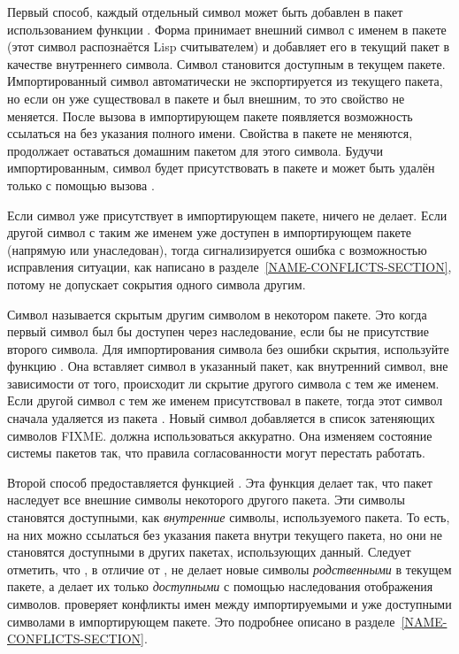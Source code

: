 Первый способ, каждый отдельный символ может быть добавлен в пакет использованием
функции . Форма  принимает внешний
символ с именем  в пакете  (этот символ распознаётся Lisp
считывателем) и добавляет его в текущий пакет в качестве внутреннего
символа. Символ становится доступным в текущем пакете. Импортированный символ
автоматически не экспортируется из текущего пакета, но если он уже существовал в
пакете и был внешним, то это свойство не меняется. После вызова 
в импортирующем пакете появляется возможность ссылаться на  без
указания полного имени. Свойства  в пакете  не меняются,
 продолжает оставаться домашним пакетом для этого символа. Будучи
импортированным, символ будет присутствовать в пакете и может быть удалён только
с помощью вызова .

Если символ уже присутствует в импортирующем пакете,  ничего не
делает. Если другой символ с таким же именем  уже доступен в
импортирующем пакете (напрямую или унаследован), тогда сигнализируется ошибка с
возможностью исправления ситуации, как написано в
разделе~\ref{NAME-CONFLICTS-SECTION}, потому  не допускает сокрытия
одного символа другим.

Символ называется скрытым другим символом в некотором пакете. Это когда первый
символ был бы доступен через наследование, если бы не присутствие второго
символа.
Для импортирования символа без ошибки скрытия, используйте функцию
. Она вставляет символ в указанный пакет, как внутренний
символ, вне зависимости от того, происходит ли скрытие другого символа с тем же
именем.
Если другой символ с тем же именем присутствовал в пакете, тогда этот символ
сначала удаляется из пакета . Новый символ добавляется в список
затеняющих символов FIXME.  должна использоваться
аккуратно. Она изменяем состояние системы пакетов так, что правила согласованности
могут перестать работать.

Второй способ предоставляется функцией . Эта функция делает
так, что пакет наследует все внешние символы некоторого другого пакета. Эти
символы становятся доступными, как \emph{внутренние} символы, используемого
пакета. То есть, на них можно ссылаться без указания пакета внутри текущего
пакета, но они не становятся доступными в других пакетах, использующих
данный. Следует отметить, что , в отличие от , не
делает новые символы \emph{родственными} в текущем пакете, а делает их только
\emph{доступными} с помощью наследования отображения символов.
 проверяет конфликты имен между импортируемыми и уже доступными
символами в импортирующем пакете. Это подробнее описано в
разделе~\ref{NAME-CONFLICTS-SECTION}.

